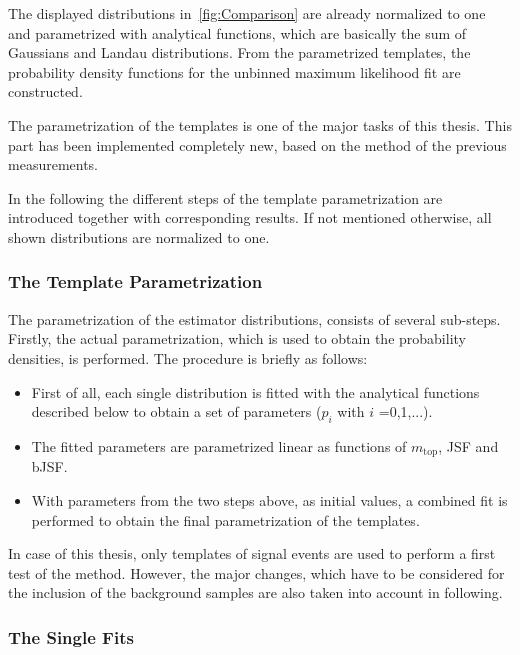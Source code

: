{ The displayed distributions in~\cref{fig:Comparison} are already normalized to one and parametrized with analytical functions, which are basically the sum of  Gaussians and Landau distributions. From the parametrized templates, the probability density functions for the unbinned maximum likelihood fit are constructed. 
 
 

The parametrization of the templates is one of the major tasks of this thesis. This part has been implemented completely new, based on the method of the previous measurements. 

In the following the different steps of the template parametrization are introduced together with corresponding results. If not mentioned otherwise, all shown distributions are normalized to one. 




  
  
\clearpage  

\subsubsection{The Template Parametrization}


The parametrization of the estimator distributions, consists of several sub-steps. Firstly, the actual parametrization, which is used to obtain the probability densities, is performed. The procedure is briefly as follows: 
\begin{itemize}
	\item First of all, each single distribution is fitted with the analytical functions described below to obtain a set of parameters ($p_i$ with $i$ =0,1,...).
	\item The fitted parameters are parametrized linear as functions of $m_{\text{top}}$, JSF and bJSF. 
	\item With parameters from the two steps above, as initial values, a combined fit is performed to obtain the final parametrization of the templates.
\end{itemize}   

 
 In case of this thesis,  only templates of signal events are used to perform a first test of the method. However, the major changes, which have to be considered for the inclusion of the background samples are also taken into account in following.  


\subsubsection{The Single Fits}  


}
